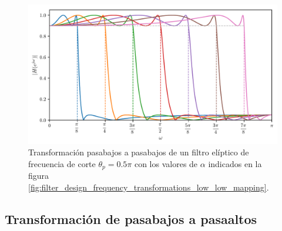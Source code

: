 \documentclass[a4paper]{report}
\begin{document}
\begin{figure}[!htb]
 \begin{center}
 \includegraphics[width=1\textwidth]{figuras/filter_design_frequency_transformations_low_low_magnitude_response.pdf}
 \caption{\label{fig:filter_design_frequency_transformations_low_low_magnitude_response} Transformación pasabajos a pasabajos de un filtro elíptico de frecuencia de corte \(\theta_p=0.5\pi\) con los valores de \(\alpha\) indicados en la figura \ref{fig:filter_design_frequency_transformations_low_low_mapping}.}
 \end{center}
\end{figure}

\subsection{Transformación de pasabajos a pasaaltos}
\end{document}
